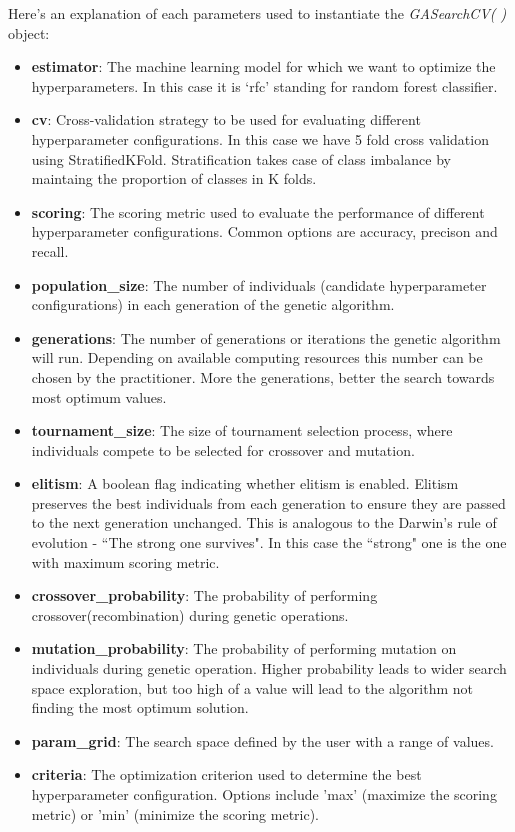 Here's an explanation of each parameters used to instantiate the \textit{GASearchCV( )} object:
\begin{itemize}
    \item \textbf{estimator}: The machine learning model for which we want to optimize the hyperparameters. In this case it is `rfc' standing for random forest classifier.
    \item \textbf{cv}: Cross-validation strategy to be used for evaluating different hyperparameter configurations. In this case we have 5 fold cross validation using StratifiedKFold. Stratification takes case of class imbalance by maintaing the proportion of classes in K folds.
    \item \textbf{scoring}: The scoring metric used to evaluate the performance of different hyperparameter configurations. Common options are accuracy, precison and recall.
    \item \textbf{population\_size}: The number of individuals (candidate hyperparameter configurations) in each generation of the genetic algorithm.
    \item \textbf{generations}: The number of generations or iterations the genetic algorithm will run. Depending on available computing resources this number can be chosen by the practitioner. More the generations, better the search towards most optimum values.
    \item \textbf{tournament\_size}: The size of tournament selection process, where individuals compete to be selected for crossover and mutation.
    \item \textbf{elitism}: A boolean flag indicating whether elitism is enabled. Elitism preserves the best individuals from each generation to ensure they are passed to the next generation unchanged. This is analogous to the Darwin's rule of evolution - ``The strong one survives". In this case the ``strong" one is the one with maximum scoring metric.
    \item \textbf{crossover\_probability}: The probability of performing crossover(recombination) during genetic operations.
    \item \textbf{mutation\_probability}: The probability of performing mutation on individuals during genetic operation. Higher probability leads to wider search space exploration, but too high of a value will lead to the algorithm not finding the most optimum solution.
    \item \textbf{param\_grid}: The search space defined by the user with a range of values.
    \item \textbf{criteria}: The optimization criterion used to determine the best hyperparameter configuration. Options include 'max' (maximize the scoring metric) or 'min' (minimize the scoring metric).

\end{itemize}
